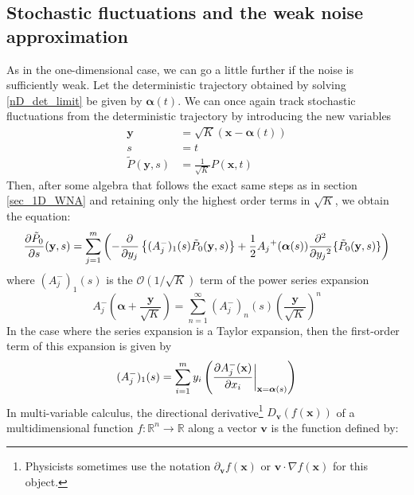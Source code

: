 \subsection{Stochastic fluctuations and the weak noise approximation}

As in the one-dimensional case, we can go a little further if the noise is sufficiently weak. Let the deterministic trajectory obtained by solving \eqref{nD_det_limit} be given by $\boldsymbol{\alpha}(t)$.  We can once again track 
stochastic fluctuations from the deterministic trajectory by introducing the new variables
\begin{equation}
\begin{aligned}
\mathbf{y} &= \sqrt{K}(\mathbf{x} - \boldsymbol{\alpha}(t))\\
s&=t\\
\tilde{P}(\mathbf{y},s) &= \frac{1}{\sqrt{K}}P(\mathbf{x},t)
\end{aligned}
\end{equation}
Then, after some algebra that follows the exact same steps as in section \ref{sec_1D_WNA} and retaining only the highest order terms in $\sqrt{K}$, we obtain the equation:
\begin{equation}
\label{nD_WNA_intermediate}
\frac{\partial \Tilde{P}_{0}}{\partial s}(\mathbf{y},s) = \sum\limits_{j=1}^{m}\left(-\frac{\partial}{\partial y_j}\left\{(A^{-}_{j})_{1}(s)\Tilde{P}_{0}(\mathbf{y},s)\right\}+\frac{1}{2}{A_j}^{+}(\boldsymbol{\alpha}(s))\frac{\partial^2}{\partial{y_j}^2}\{\Tilde{P}_{0}(\mathbf{y},s)\}\right)
\end{equation}
where $(A^{-}_{j})_{1}(s)$ is the $\mathcal{O}(1/\sqrt{K})$ term of the power series expansion
\begin{equation*}
A^-_{j}(\boldsymbol{\alpha} + \frac{\mathbf{y}}{\sqrt{K}}) = \sum\limits_{n=1}^{\infty}(A^{-}_{j})_{n}(s)\left(\frac{\mathbf{y}}{\sqrt{K}}\right)^n
\end{equation*}
In the case where the series expansion is a Taylor expansion, then the first-order term of this expansion is given by
\begin{equation}
\label{nD_WNA_taylor_term}
(A^{-}_{j})_{1}(s) = \sum\limits_{i=1}^{m} y_i\left(\frac{\partial A^{-}_j(\mathbf{x})}{\partial x_i}\bigg{|}_{\mathbf{x}=\boldsymbol{\alpha}(s)}\right)
\end{equation}
In multi-variable calculus, the directional derivative\footnote{Physicists sometimes use the notation $\partial_{\mathbf{v}}f(\mathbf{x})$ or $\mathbf{v}\cdot\nabla f(\mathbf{x})$ for this object.} $D_{\mathbf{v}}(f(\mathbf{x}))$ of a multidimensional function $f: \mathbb{R}^n \to \mathbb{R}$ along a vector $\mathbf{v}$ is the function defined by:
